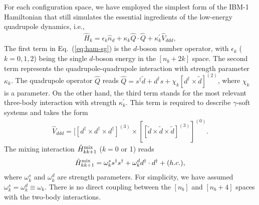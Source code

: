 \documentclass[twocolumn,showpacs,amsmath,amssymb,superscriptaddress]{revtex4-1}
\begin{document}
For each configuration space, we have employed the simplest form of the 
IBM-1 Hamiltonian that still simulates the essential ingredients of the 
low-energy quadrupole dynamics, i.e., 
\begin{eqnarray}
\label{eq:ham-sg}
 \hat H_k = \epsilon_k\hat n_d+\kappa_k\hat Q\cdot\hat Q + \kappa^{\prime}_k\hat V_{ddd},
\end{eqnarray}
The first term in Eq.~(\ref{eq:ham-sg}) is the $d$-boson number
operator, with $\epsilon_k$ ($k=0,1,2$) being the single $d$-boson
energy in the $[n_b+2k]$ space. The second term represents 
the quadrupole-quadrupole interaction with strength 
parameter $\kappa_k$. The quadrupole operator $\hat Q$  reads $\hat
Q=s^{\dagger}\tilde d + d^{\dagger}s + \chi_k[d^{\dagger}\times\tilde d]^{(2)}$, where $\chi_k$ is
a parameter. On the other hand, the third term stands 
for the most relevant 
three-body interaction with strength  
$\kappa^{\prime}_k$.  This term is required to describe $\gamma$-soft 
systems \cite{vanisacker1981,nomura2012tri} and 
takes the form
\begin{eqnarray}
\label{eq:ddd}
 \hat V_{ddd} = [[d^{\dagger}\times d^{\dagger}\times d^{\dagger}]^{(3)}\times [[\tilde d\times\tilde d\times\tilde d]^{(3)}]^{(0)}.
\end{eqnarray}
The mixing interaction $\hat H_{kk+1}^{\rm mix}$ ($k=0$ or 1) reads
\begin{eqnarray}
 \hat H^{\rm mix}_{kk+1}=\omega^s_{k} s^{\dagger}s^{\dagger} + \omega^d_{k} d^{\dagger}\cdot d^{\dagger} + (h.c.), 
\end{eqnarray}
where $\omega^s_{k}$ and $\omega^d_k$ are strength parameters. For
simplicity, we have assumed  $\omega^s_k=\omega^d_k\equiv\omega_k$.
There is no direct coupling between the $[n_b]$ and $[n_b+4]$ spaces
with the two-body  interactions. 
\end{document}
